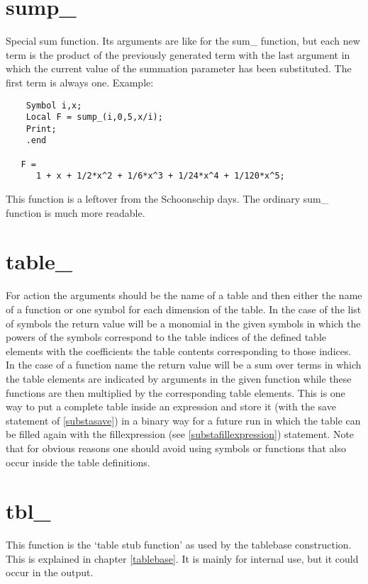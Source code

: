 \section{sump\_}
\label{funsump}
\noindent Special sum function. Its arguments are like for the 
sum\_ function, but each new term is the product of the previously 
generated term with the last argument in which the current value of the 
summation parameter has been substituted. The first term is always one. 
Example:
\begin{verbatim}
    Symbol i,x;
    Local F = sump_(i,0,5,x/i);
    Print;
    .end

   F =
      1 + x + 1/2*x^2 + 1/6*x^3 + 1/24*x^4 + 1/120*x^5;
\end{verbatim}
This function is a leftover from the Schoonschip days. 
The ordinary sum\_ function is much more readable.


\section{table\_}
\label{funtable}
\noindent For action the arguments should be the name of a table and then 
either the name of a function or one symbol for each dimension of the 
table. In the case of the list of symbols the return value will be a 
monomial in the given symbols in which the powers of the symbols correspond 
to the table indices of the defined table elements with the coefficients 
the table contents corresponding to those indices. In the case of a 
function name the return value will be a sum over terms in which the table 
elements are indicated by arguments in the given function while these 
functions are then multiplied by the corresponding table elements. This is 
one way to put a complete table inside an expression and store it (with the 
save statement of \ref{substasave}) in a binary way for a future run in 
which the table can be filled again with the 
fillexpression (see \ref{substafillexpression}) 
statement. Note that for obvious reasons one should avoid using symbols or 
functions that also occur inside the table definitions.


\section{tbl\_}
\label{funtbl}
\noindent This function is the `table stub function' as used by the 
tablebase construction. This is explained in chapter 
\ref{tablebase}. It is mainly for internal use, but it could occur in the 
output.

